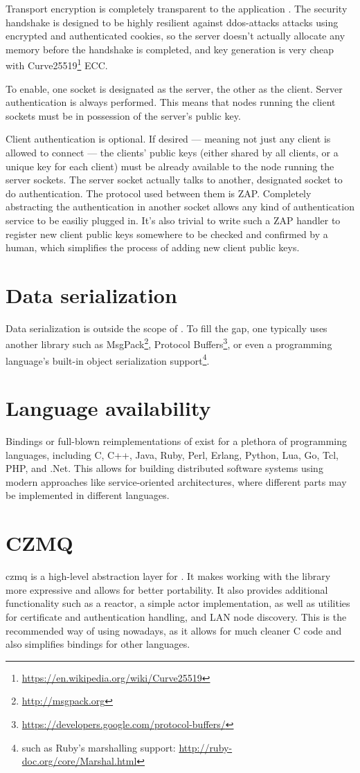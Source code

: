 Transport encryption is completely transparent to the application . The
security handshake is designed to be highly resilient against
\glspl{ddos-attack} attacks using encrypted and authenticated cookies, so the
server doesn't actually allocate any memory before the handshake is completed,
and key generation is very cheap \cite[p.~2]{djb:ed25519} with
Curve25519\footnote{\url{https://en.wikipedia.org/wiki/Curve25519}} \gls{ECC}.

To enable, one socket is designated as the server, the other as the client.
Server authentication is always performed. This means that nodes running the
client sockets must be in possession of the server's public key.

Client authentication is optional. If desired --- meaning not just any client
is allowed to connect --- the clients' public keys (either shared by all
clients, or a unique key for each client) must be already available to the node
running the server sockets. The server socket actually talks to another,
designated socket to do authentication. The protocol used between them is
\gls{ZAP}. Completely abstracting the authentication in another socket allows
any kind of authentication service to be easiliy plugged in. It's also trivial
to write such a ZAP handler to register new client public keys somewhere to be
checked and confirmed by a human, which simplifies the process of adding new
client public keys.

\section{Data serialization}
Data serialization is outside the scope of \zmq. To fill the gap, one typically
uses another library such as MsgPack\footnote{\url{http://msgpack.org}},
Protocol
Buffers\footnote{\url{https://developers.google.com/protocol-buffers/}}, or
even a programming language's built-in object serialization
support\footnote{such as Ruby's marshalling support:
\url{http://ruby-doc.org/core/Marshal.html}}.

\section{Language availability}
Bindings or full-blown reimplementations of \zmq exist for a plethora of
programming languages, including C, C++, Java, Ruby, Perl, Erlang, Python, Lua,
Go, Tcl, PHP, and .Net. This allows for building distributed software systems
using modern approaches like service-oriented architectures, where different
parts may be implemented in different languages.

\section{CZMQ}
\gls{czmq} is a high-level abstraction layer for \zmq. It makes working with the \zmq
library more expressive and allows for better portability. It also provides
additional functionality such as a reactor, a simple actor implementation, as
well as utilities for certificate and authentication handling, and LAN node
discovery. This is the recommended way of using \zmq nowadays, as it allows for
much cleaner C code and also simplifies bindings for other languages.

